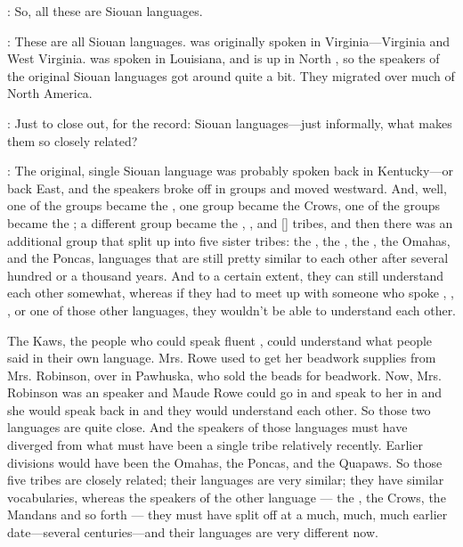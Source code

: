 \documentclass[output=paper]{LSP/langsci}
\begin{document}
: So, all these are Siouan languages.

: These are all Siouan languages.  was originally spoken in Virginia---Virginia and West Virginia.  was spoken in Louisiana, and  is up in North , so the speakers of the original Siouan languages got around quite a bit. They migrated over much of North America.

: Just to close out, for the record: Siouan languages---just informally, what makes them so closely related?

: The original, single Siouan language was probably spoken back in Kentucky---or back East, and the speakers broke off in groups and moved westward. And, well, one of the groups became the , one group became the Crows, one of the groups became the  ; a different group became the , , and  [] tribes, and then there was an additional group that split up into five sister tribes: the , the , the , the Omahas, and the Poncas, languages that are still pretty similar to each other after several hundred or a thousand years. And to a certain extent, they can still understand each other somewhat, whereas if they had to meet up with someone who spoke  , , , or one of those other languages, they wouldn't be able to understand each other.

The Kaws, the people who could speak fluent , could understand what  people said in their own language. Mrs. Rowe used to get her beadwork supplies from Mrs. Robinson, over in Pawhuska, who sold the beads for beadwork. Now, Mrs. Robinson was an  speaker and Maude Rowe could go in and speak to her in  and she would speak back in  and they would understand each other. So those two languages are quite close. And the speakers of those languages must have diverged from what must have been a single tribe relatively recently. Earlier divisions would have been the Omahas, the Poncas, and the Quapaws. So those five tribes are closely related; their languages are very similar; they have similar vocabularies, whereas the speakers of the other language --- the , the Crows, the Mandans and so forth --- they must have split off at a much, much, much earlier date---several centuries---and their languages are very different now.
\end{document}

